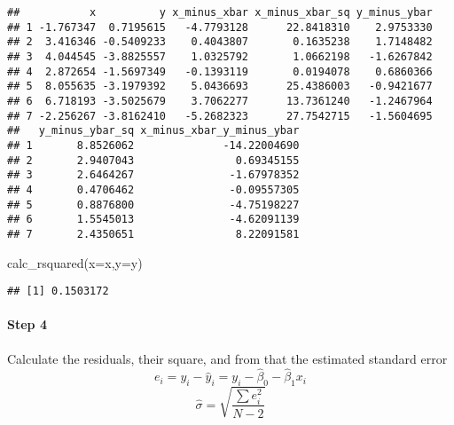 \documentclass[
]{article}
\newenvironment{Shaded}{\begin{snugshade}}{\end{snugshade}}
\newcommand{\AttributeTok}[1]{\textcolor[rgb]{0.77,0.63,0.00}{#1}}
\newcommand{\CommentTok}[1]{\textcolor[rgb]{0.56,0.35,0.01}{\textit{#1}}}
\newcommand{\FunctionTok}[1]{\textcolor[rgb]{0.00,0.00,0.00}{#1}}
\newcommand{\NormalTok}[1]{#1}
\begin{document}
\begin{verbatim}
##           x          y x_minus_xbar x_minus_xbar_sq y_minus_ybar
## 1 -1.767347  0.7195615   -4.7793128      22.8418310    2.9753330
## 2  3.416346 -0.5409233    0.4043807       0.1635238    1.7148482
## 3  4.044545 -3.8825557    1.0325792       1.0662198   -1.6267842
## 4  2.872654 -1.5697349   -0.1393119       0.0194078    0.6860366
## 5  8.055635 -3.1979392    5.0436693      25.4386003   -0.9421677
## 6  6.718193 -3.5025679    3.7062277      13.7361240   -1.2467964
## 7 -2.256267 -3.8162410   -5.2682323      27.7542715   -1.5604695
##   y_minus_ybar_sq x_minus_xbar_y_minus_ybar
## 1       8.8526062              -14.22004690
## 2       2.9407043                0.69345155
## 3       2.6464267               -1.67978352
## 4       0.4706462               -0.09557305
## 5       0.8876800               -4.75198227
## 6       1.5545013               -4.62091139
## 7       2.4350651                8.22091581
\end{verbatim}

\begin{Shaded}
\begin{Highlighting}[]
\FunctionTok{calc\_rsquared}\NormalTok{(}\AttributeTok{x=}\NormalTok{x,}\AttributeTok{y=}\NormalTok{y)}
\end{Highlighting}
\end{Shaded}

\begin{verbatim}
## [1] 0.1503172
\end{verbatim}

\begin{Shaded}
\end{Shaded}

\hypertarget{step-4}{%
\paragraph{Step 4}\label{step-4}}

Calculate the residuals, their square, and from that the estimated
standard error \[e_i=y_i-\hat y_i=y_i-\hat\beta_0-\hat\beta_1 x_i\]
\[\hat\sigma=\sqrt{\frac{\sum e_i^2}{N-2}}\]
\end{document}

